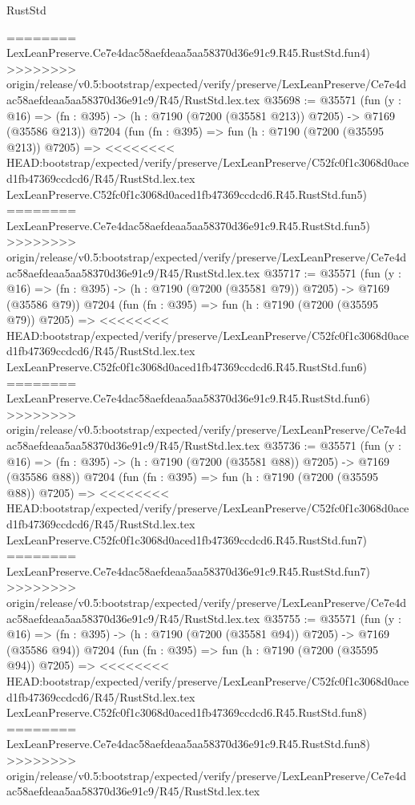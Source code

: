 \begin{lexlean}{RustStd}
\begin{coremodule}
{\begin{coremodule}
{{{{{{{{{{{{{{{{{{{{{{{{{{{{{{{{========
    LexLeanPreserve.Ce7e4dac58aefdeaa5aa58370d36e91c9.R45.RustStd.fun4)
>>>>>>>> origin/release/v0.5:bootstrap/expected/verify/preserve/LexLeanPreserve/Ce7e4dac58aefdeaa5aa58370d36e91c9/R45/RustStd.lex.tex
@35698 := @35571
    (fun (y : @16) => (fn : @395) -> (h : @7190 (@7200 (@35581 @213)) @7205) -> @7169 (@35586 @213))
    @7204
    (fun (fn : @395) =>
    fun (h : @7190 (@7200 (@35595 @213)) @7205) =>
<<<<<<<< HEAD:bootstrap/expected/verify/preserve/LexLeanPreserve/C52fc0f1c3068d0aced1fb47369ccdcd6/R45/RustStd.lex.tex
    LexLeanPreserve.C52fc0f1c3068d0aced1fb47369ccdcd6.R45.RustStd.fun5)
========
    LexLeanPreserve.Ce7e4dac58aefdeaa5aa58370d36e91c9.R45.RustStd.fun5)
>>>>>>>> origin/release/v0.5:bootstrap/expected/verify/preserve/LexLeanPreserve/Ce7e4dac58aefdeaa5aa58370d36e91c9/R45/RustStd.lex.tex
@35717 := @35571
    (fun (y : @16) => (fn : @395) -> (h : @7190 (@7200 (@35581 @79)) @7205) -> @7169 (@35586 @79))
    @7204
    (fun (fn : @395) =>
    fun (h : @7190 (@7200 (@35595 @79)) @7205) =>
<<<<<<<< HEAD:bootstrap/expected/verify/preserve/LexLeanPreserve/C52fc0f1c3068d0aced1fb47369ccdcd6/R45/RustStd.lex.tex
    LexLeanPreserve.C52fc0f1c3068d0aced1fb47369ccdcd6.R45.RustStd.fun6)
========
    LexLeanPreserve.Ce7e4dac58aefdeaa5aa58370d36e91c9.R45.RustStd.fun6)
>>>>>>>> origin/release/v0.5:bootstrap/expected/verify/preserve/LexLeanPreserve/Ce7e4dac58aefdeaa5aa58370d36e91c9/R45/RustStd.lex.tex
@35736 := @35571
    (fun (y : @16) => (fn : @395) -> (h : @7190 (@7200 (@35581 @88)) @7205) -> @7169 (@35586 @88))
    @7204
    (fun (fn : @395) =>
    fun (h : @7190 (@7200 (@35595 @88)) @7205) =>
<<<<<<<< HEAD:bootstrap/expected/verify/preserve/LexLeanPreserve/C52fc0f1c3068d0aced1fb47369ccdcd6/R45/RustStd.lex.tex
    LexLeanPreserve.C52fc0f1c3068d0aced1fb47369ccdcd6.R45.RustStd.fun7)
========
    LexLeanPreserve.Ce7e4dac58aefdeaa5aa58370d36e91c9.R45.RustStd.fun7)
>>>>>>>> origin/release/v0.5:bootstrap/expected/verify/preserve/LexLeanPreserve/Ce7e4dac58aefdeaa5aa58370d36e91c9/R45/RustStd.lex.tex
@35755 := @35571
    (fun (y : @16) => (fn : @395) -> (h : @7190 (@7200 (@35581 @94)) @7205) -> @7169 (@35586 @94))
    @7204
    (fun (fn : @395) =>
    fun (h : @7190 (@7200 (@35595 @94)) @7205) =>
<<<<<<<< HEAD:bootstrap/expected/verify/preserve/LexLeanPreserve/C52fc0f1c3068d0aced1fb47369ccdcd6/R45/RustStd.lex.tex
    LexLeanPreserve.C52fc0f1c3068d0aced1fb47369ccdcd6.R45.RustStd.fun8)
========
    LexLeanPreserve.Ce7e4dac58aefdeaa5aa58370d36e91c9.R45.RustStd.fun8)
>>>>>>>> origin/release/v0.5:bootstrap/expected/verify/preserve/LexLeanPreserve/Ce7e4dac58aefdeaa5aa58370d36e91c9/R45/RustStd.lex.tex
}}}}}}}}}}}}}}}}}}}}}}}}}}}}}}}}
\end{coremodule}}
\end{coremodule}
\end{lexlean}
